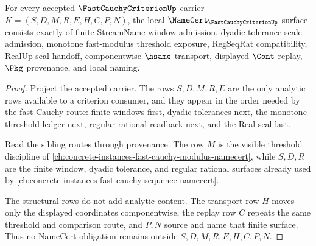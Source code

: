 \begin{theorem}
\label{thm:fast-cauchy-criterion-namecert-obligations}
For every accepted $\FastCauchyCriterionUp$ carrier $K=(S,D,M,R,E,H,C,P,N)$, the local $\NameCert_{\FastCauchyCriterionUp}$ surface consists exactly of finite StreamName window admission, dyadic tolerance-scale admission, monotone fast-modulus threshold exposure, RegSeqRat compatibility, RealUp seal handoff, componentwise $\hsame$ transport, displayed $\Cont$ replay, $\Pkg$ provenance, and local naming.
\end{theorem}
\begin{proof}
Project the accepted carrier. The rows $S,D,M,R,E$ are the only analytic rows available to a criterion consumer, and they appear in the order needed by the fast Cauchy route: finite windows first, dyadic tolerances next, the monotone threshold ledger next, regular rational readback next, and the Real seal last.

Read the sibling routes through provenance. The row $M$ is the visible threshold discipline of \autoref{ch:concrete-instances-fast-cauchy-modulus-namecert}, while $S,D,R$ are the finite window, dyadic tolerance, and regular rational surfaces already used by \autoref{ch:concrete-instances-fast-cauchy-sequence-namecert}.

The structural rows do not add analytic content. The transport row $H$ moves only the displayed coordinates componentwise, the replay row $C$ repeats the same threshold and comparison route, and $P,N$ source and name that finite surface. Thus no NameCert obligation remains outside $S,D,M,R,E,H,C,P,N$.
\end{proof}

